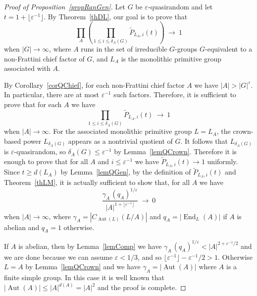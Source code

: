\documentclass[11pt,reqno]{amsart}
\numberwithin{equation}{section}
\theoremstyle{definition}
\theoremstyle{remark}
\newcommand{\Aut}{\mathop{\mathrm{Aut}}}
\newcommand{\End}{\mathop{\mathrm{End}}}
\begin{document}
\begin{proof}[Proof of Proposition~\ref{propRanGen}] 
Let $G$ be $\varepsilon$-quasirandom and let $t= 1+ \lfloor \varepsilon^{-1} \rfloor$.
By Theorem~\ref{thDL}, our goal is to prove that 
$$ \prod_{A} \left( \prod_{1 \leq i \leq \delta_A(G)} \widetilde{P}_{L_A,i}(t) \right) 
\> \to \> 1 $$
when $|G| \to \infty$,
where $A$ runs in the set of irreducible $G$-groups $G$-equivalent to a non-Frattini
chief factor of $G$,
and $L_A$ is the monolithic primitive group associated with $A$.

By Corollary~\ref{corQChief}, for each non-Frattini chief factor $A$ we have $|A| > |G|^\varepsilon$.
In particular, there are at most $\varepsilon^{-1}$ such factors.
Therefore, it is sufficient to prove that for each $A$ we have
$$ \prod_{1 \leq i \leq \delta_A(G)} \widetilde{P}_{L_A,i}(t)  \> \to \> 1 $$
when $|A| \to \infty$.
For the associated monolithic primitive group $L=L_A$,
the crown-based power $L_{\delta_A(G)}$ appears as a nontrivial quotient of $G$.
It follows that $L_{\delta_A(G)}$ is $\varepsilon$-quasirandom,
so $\delta_A(G) \leq \varepsilon^{-1}$ by Lemma~\ref{lemQCrown}.
Therefore it is enough to prove that for all $A$ and $i \leq \varepsilon^{-1}$
we have $\widetilde{P}_{L_A,i}(t)  \to 1$ uniformly.
Since $t \geq d(L_A)$ by Lemma~\ref{lemQGen},
by the definition of $\widetilde{P}_{L_A,i}(t)$ and Theorem~\ref{thLM},
it is actually sufficient to show that, for all $A$ we have
$$ \frac{\gamma_A \, (q_A)^{1/\varepsilon}}{|A|^{1+ \lfloor \varepsilon^{-1} \rfloor}} \> \to \> 0 $$
when $|A| \to \infty$,
where $\gamma_A = |C_{\Aut(L)}(L/A)|$ and $q_A = |\End_L(A)|$ if $A$ is abelian and $q_A =1$ otherwise.

If $A$ is abelian, then by Lemma~\ref{lemComp} we have
$\gamma_A \, (q_A)^{1/\varepsilon} < |A|^{2+\varepsilon^{-1}/2}$
and we are done because we can assume $\varepsilon < 1/3$,
and so $\lfloor \varepsilon^{-1} \rfloor - \varepsilon^{-1}/2 >1$.
Otherwise $L=A$ by Lemma~\ref{lemQCrown} and we have $\gamma_A =|\Aut(A)|$ where $A$ is a finite simple group.
In this case it is well known that $|\Aut(A)| \leq |A|^{d(A)} = |A|^2$ and the proof is complete.
\end{proof}













\vspace{0.1cm}
\end{document}
